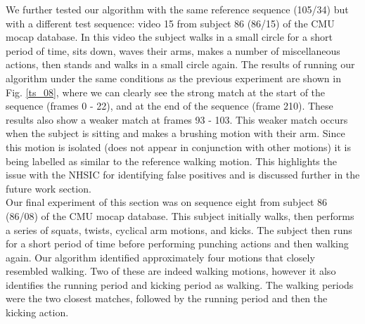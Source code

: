 We further tested our algorithm with the same reference sequence (105/34) but with a different test sequence: video 15 from subject 86 (86/15) of the CMU mocap database. In this video the subject walks in a small circle for a short period of time, sits down, waves their arms, makes a number of miscellaneous actions, then stands and walks in a small circle again. The results of running our algorithm under the same conditions as the previous experiment are shown in Fig. \ref{ts_08}, where we can clearly see the strong match at the start of the sequence (frames 0 - 22), and at the end of the sequence (frame 210). These results also show a weaker match at frames 93 - 103. This weaker match occurs when the subject is sitting and makes a brushing motion with their arm. Since this motion is isolated (does not appear in conjunction with other motions) it is being labelled as similar to the reference walking motion. This highlights the issue with the NHSIC for identifying false positives and is discussed further in the future work section. \\

Our final experiment of this section was on sequence eight from subject 86 (86/08) of the CMU mocap database. This subject initially walks, then performs a series of squats, twists, cyclical arm motions, and kicks. The subject then runs for a short period of time before performing punching actions and then walking again. Our algorithm identified approximately four motions that closely resembled walking. Two of these are indeed walking motions, however it also identifies the running period and kicking period as walking. The walking periods were the two closest matches, followed by the running period and then the kicking action. 

